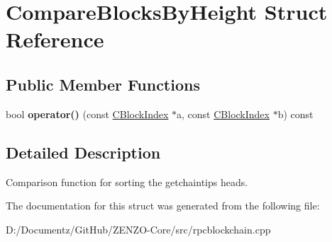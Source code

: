 \hypertarget{struct_compare_blocks_by_height}{}\section{Compare\+Blocks\+By\+Height Struct Reference}
\label{struct_compare_blocks_by_height}
\subsection*{Public Member Functions}
\begin{DoxyCompactItemize}
\item 
\mbox{\label{struct_compare_blocks_by_height_a613b9fc9c04de22e8e521f908c932454}} 
bool {\bfseries operator()} (const \mbox{\hyperlink{class_c_block_index}{C\+Block\+Index}} $\ast$a, const \mbox{\hyperlink{class_c_block_index}{C\+Block\+Index}} $\ast$b) const
\end{DoxyCompactItemize}


\subsection{Detailed Description}
Comparison function for sorting the getchaintips heads. 

The documentation for this struct was generated from the following file\+:\begin{DoxyCompactItemize}
\item 
D\+:/\+Documentz/\+Git\+Hub/\+Z\+E\+N\+Z\+O-\/\+Core/src/rpcblockchain.\+cpp\end{DoxyCompactItemize}
